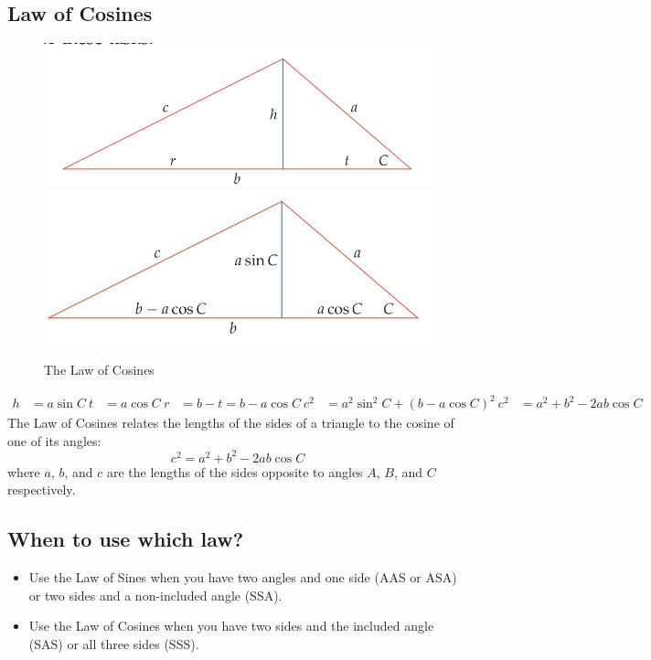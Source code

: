 \subsection{Law of Cosines}
\begin{figure}
    \centering
    \includegraphics[scale=0.3]{pics/33.png}
    \includegraphics[scale=0.3]{pics/34.png}
    \caption{The Law of Cosines}
\end{figure}
\begin{align}
    h &= a\sin C\
    t &= a \cos C \
    r &= b - t = b - a \cos C \
    c^2  &= a^2 \sin^2 C + (b - a \cos C)^2 \
    c^2 &= a^2 + b^2 - 2ab \cos C
\end{align}
The Law of Cosines relates the lengths of the sides of a triangle to the cosine of one of its angles:
\[ c^2 = a^2 + b^2 - 2ab \cos C \]
where $a$, $b$, and $c$ are the lengths of the sides opposite to angles $A$, $B$, and $C$ respectively.

\subsection{When to use which law?}
\begin{itemize}
    \item Use the Law of Sines when you have two angles and one side (AAS or ASA) or two sides and a non-included angle (SSA).
    \item Use the Law of Cosines when you have two sides and the included angle (SAS) or all three sides (SSS).
\end{itemize}

